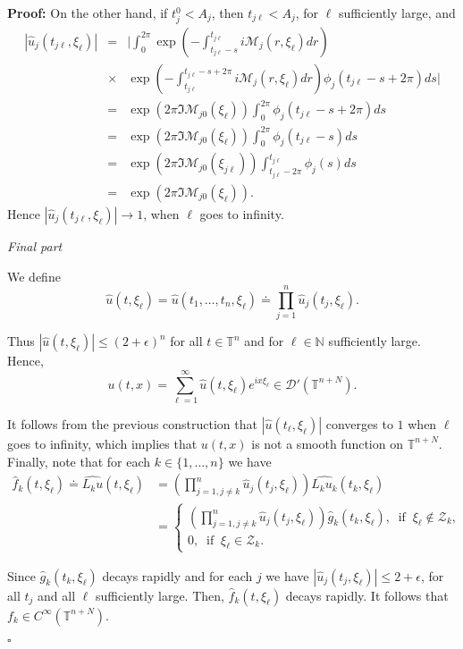 \documentclass[12pt]{elsarticle}
\numberwithin{equation}{section}
\newenvironment{proof}[1][\noindent \textbf{Proof: }]{#1}{ \hfill $\square$ \vspace{2mm}}
\begin{document}
\begin{proof}
	On the other hand, if $t_{j}^{0}<A_j$, then $t_{j\ell}<A_j$, for  $\ell$ sufficiently large, and 
	\begin{eqnarray*}
		|\widehat{u}_j(t_{j\ell},\xi_\ell)|&=& \Big|\int_{0}^{2\pi}\exp\left(-\int_{t_{j\ell}-s}^{t_{j\ell}}i\mathcal{M}_j(r,\xi_\ell)dr \right)
		\\
		&\times&\exp\left(- \int^{t_{j\ell}-s+2\pi}_{t_{j\ell}}i\mathcal{M}_j(r,\xi_\ell)dr\right) \phi_j(t_{j\ell}-s+2\pi)ds\Big|\\
		&=&\exp(2\pi \Im \mathcal{M}_{j0}(\xi_{\ell}))\int_{0}^{2\pi} \phi_j(t_{j\ell}-s+2\pi)ds \\
		&=& \exp(2\pi \Im\mathcal{M}_{j0}(\xi_{\ell})) \int_{0}^{2\pi} \phi_j(t_{j\ell}-s)ds\\
		&=& \exp(2\pi \Im\mathcal{M}_{j0}(\xi_{j\ell})) 
		\int_{t_{j\ell} - 2 \pi}^{t_{j\ell}} \phi_j(s)ds		\\
		&=& \exp(2\pi \Im\mathcal{M}_{j0}(\xi_{\ell})).
	\end{eqnarray*}
Hence $|\widehat{u}_j(t_{j\ell},\xi_{\ell})| \rightarrow 1$, when $\ell$ goes to infinity.\\
	
	
	
	\centerline{\it Final part}
	
	We define 
	$$
	\widehat{u}(t,\xi_{\ell})=\widehat{u}(t_1,\ldots,t_n,\xi_{\ell})\doteq\prod_{j=1}^{n} \widehat{u}_j(t_j,\xi_{\ell}). 
	$$
	
	Thus 
	$
	|\widehat{u}(t,\xi_{\ell})|\leq (2+\epsilon)^n
	$
	for all $t\in \mathbb{T}^n$ and for $\ell\in\mathbb{N}$ sufficiently large. Hence, 
	$$
	u(t,x)=\sum_{\ell=1}^{\infty} \widehat{u}(t,\xi_{\ell}) e^{i x \xi_{\ell}}\in \mathcal{D}'(\mathbb{T}^{n+N}).
	$$
	
	It follows from the previous construction  that 
	$|\widehat{u}(t_\ell,\xi_{\ell})|$ converges to $1$ when $\ell$ goes to infinity, which implies that $u(t,x) $ is not a smooth function  on $\mathbb{T}^{n+N}$. \\
	
	Finally,  note that for each $k\in\{1,\ldots,n\}$ we have 
	\begin{align*}
	\widehat{f}_k(t,\xi_\ell) \doteq \widehat{L_k u}(t,\xi_{\ell})
	& = \left(\prod_{j=1, j\neq k}^n \widehat{u}_j(t_j,\xi_\ell) \right) \widehat{L_k u_k}(t_k,\xi_\ell) \\
	& = \left\{
	\begin{array}{l}
	\left(\prod_{j=1, j\neq k}^n \widehat{u}_j(t_j,\xi_\ell) \right) \widehat{g}_k(t_k,\xi_{\ell}),  \ \textrm{ if } \ 
	\xi_{\ell}\notin\mathcal{Z}_k, \\
	0, \ \textrm{ if } \  \xi_{\ell}\in\mathcal{Z}_k.
	\end{array}
	\right.
	\end{align*}
	

	Since $\widehat{g}_k(t_k,\xi_{\ell}) $ decays rapidly and for each $j$ we have $|\widehat{u}_j(t_j,\xi_\ell)|\leq 2+\epsilon$, for all $t_j$ and all $\ell$ sufficiently large. Then, $\widehat{f}_k(t,\xi_\ell)$ decays rapidly. It follows that $f_k\in C^{\infty}(\mathbb{T}^{n+N})$.

	
\end{proof} 
\end{document}
